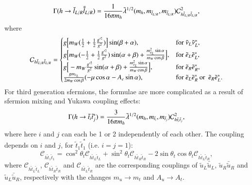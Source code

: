 \documentclass[final,3p,times]{elsarticle}
\begin{document}
\begin{equation} \label{hlLRlLR}
\Gamma(h \rightarrow \tilde{l}_{L/R} \bar{\tilde{l}}_{L/R}) = {1 \over 16 \pi m_{h}}\tilde{\lambda}^{1/2}(m_h,m_{\tilde{l}_{L/R}}, m_{\tilde{l}_{L/R}}) \mathcal{C}_{h \tilde{l}_{L/R} \tilde{l}_{L/R}}^2,
\end{equation}
where
\begin{equation}
\mathcal{C}_{h \tilde{l}_{L/R} \tilde{l}_{L/R}} = \begin{cases}
			g\Big[m_{W}({1 \over 2}+{1 \over 2}{g'^2 \over g^2})\Big]\sin(\beta+\alpha), &$for $ \tilde{\nu}_L {\tilde{\nu}}_L^*, \\
			g\Big[m_{W}(-{1 \over 2}+{1 \over 2}{g'^2 \over g^2})\sin(\alpha+\beta) + {m_{\tilde{e}_L}^2 \sin\alpha \over m_{W} \cos\beta}\Big], &$for $ \tilde{e}_L \tilde{{e}}_L^*, \\
			g\Big[-m_{W}{g'^2 \over g^2}\sin(\alpha+\beta) + {m_{\tilde{e}_{L}}^2\sin\alpha \over m_{W} \cos\beta}\Big], &$for $ \tilde{e}_R {\tilde{e}}_R^*, \\
			{g m_{\tilde{e}_L} \over 2 m_{W} \cos \beta} (-\mu \cos \alpha - A_{e}\sin\alpha), &$for $ \tilde{e}_L {\tilde{e}}_R^* \: $or $\: \tilde{e}_R {\tilde{e}}_L^*. \\
			\end{cases}
\end{equation}
For third generation sfermions, the formulae are more complicated as a result of sfermion mixing and Yukawa coupling effects:
\begin{equation} \label{hstst}
\Gamma(h \rightarrow \tilde{t}_{i} \tilde{t}_{j}^*) = {3 \over 16 \pi m_{h}} \tilde{\lambda}^{1/2}(m_h,m_{\tilde{t}_i}, m_{\tilde{t}_j}) \mathcal{C}_{h \tilde{t}_{i} \tilde{t}_{j}}^2,
\end{equation}
where here $i$ and $j$ can each be 1 or 2 independently of each other. The coupling depends on $i$ and $j$, for $\tilde{t}_1 {\tilde{t}}_1^*$ (i.e. $i=j=1$):
\begin{equation}
\mathcal{C}_{h \tilde{t}_{1} \tilde{t}_{1}} = \cos^2 \theta_t \mathcal{C}_{h \tilde{t}_{L} \tilde{t}_{L}} + \sin^2 \theta_t \mathcal{C}_{h \tilde{t}_{R} \tilde{t}_{R}} - 2\sin\theta_t \cos\theta_t \mathcal{C}_{h \tilde{t}_{L} \tilde{t}_{R}},
\end{equation}
where $\mathcal{C}_{h \tilde{t}_{L}\tilde{t}_{L}}$, $\mathcal{C}_{h \tilde{t}_{R} \tilde{t}_{R}}$ and $\mathcal{C}_{h \tilde{t}_{L} \tilde{t}_{R}}$ are the corresponding couplings of $\tilde{u}_L \bar{\tilde{u}}_L$, $\tilde{u}_R \bar{\tilde{u}}_R$ and $\tilde{u}_L \bar{\tilde{u}}_R$, respectively with the changes $m_u \rightarrow m_t$ and $A_u \rightarrow A_t$.
\end{document}
